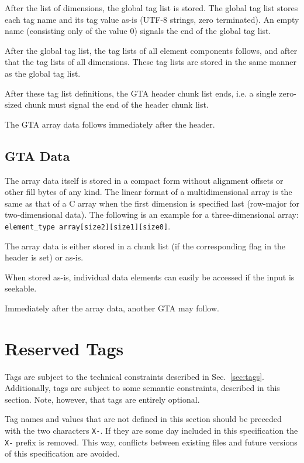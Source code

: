 \documentclass[a4paper,11pt]{article}
\newcommand{\code}[1]{\texttt{#1}}
\begin{document}
After the list of dimensions, the global tag list is stored.  The global tag
list stores each tag name and its tag value as-is (\mbox{UTF-8} strings, zero
terminated). An empty name (consisting only of the value 0) signals
the end of the global tag list.

After the global tag list, the tag lists of all element components follows, and
after that the tag lists of all dimensions. These tag lists are stored in the
same manner as the global tag list.

After these tag list definitions, the GTA header chunk list ends, i.e. a
single zero-sized chunk must signal the end of the header chunk list.

The GTA array data follows immediately after the header.

\subsection{GTA Data}

The array data itself is stored in a compact form without alignment offsets or
other fill bytes of any kind. The linear format of a multidimensional array is
the same as that of a C array when the first dimension is specified last
(row-major for two-dimensional data). The following is an example for a
three-dimensional array: \code{element\_type array[size2][size1][size0]}.

The array data is either stored in a chunk list (if the corresponding flag in
the header is set) or as-is.

When stored as-is, individual data elements can easily be accessed if the input
is seekable.

Immediately after the array data, another GTA may follow.

\section{Reserved Tags}
\label{sec:reserved-tags}

Tags are subject to the technical constraints described in Sec.~\ref{sec:tags}.
Additionally, tags are subject to some semantic constraints, described in this
section. Note, however, that tags are entirely optional.

Tag names and values that are not defined in this section should be preceded
with the two characters \code{X-}. If they are some day included in this
specification the \code{X-} prefix is removed. This way, conflicts between
existing files and future versions of this specification are avoided.
\end{document}
